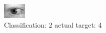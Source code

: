 \begin{figure}[h!]
\begin{center}
\includegraphics[width=0.60\columnwidth]{figures/ID840_class_2_target_4.png}
\end{center}
\caption{ Classification: 2 actual target: 4}
\label{fig:ID840_class_2_target_4}
\end{figure}
